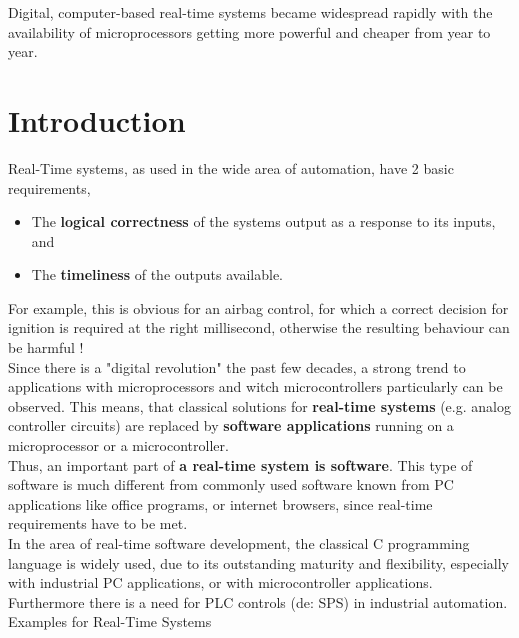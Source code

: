 Digital, computer-based real-time systems became widespread rapidly with the availability of microprocessors getting more powerful and cheaper from year to year.

\section{Introduction}

Real-Time systems, as used in the wide area of automation, have 2 basic requirements,

\begin{itemize}
	\item  The \textbf{logical correctness} of the systems output as a response to its inputs, and
	\item  The \textbf{timeliness} of the outputs available.
\end{itemize}

For example, this is obvious for an airbag control, for which a correct decision for ignition is required at the right millisecond, otherwise the resulting behaviour can be harmful !\\

Since there is a "digital revolution" the past few decades, a strong trend to applications with microprocessors and witch microcontrollers particularly can be observed. This means, that classical solutions for \textbf{real-time systems} (e.g. analog controller circuits) are replaced by \textbf{software applications} running on a microprocessor or a microcontroller.\\

Thus, an important part of \textbf{a real-time system is software}. This type of software is much different from commonly used software known from PC applications like office programs, or internet browsers, since real-time requirements have to be met.\\

In the area of real-time software development, the classical C programming language is widely used, due to its outstanding maturity and flexibility, especially with industrial PC applications, or with microcontroller applications. Furthermore there is a need for PLC controls (de: SPS) in industrial automation. Examples for Real-Time Systems

